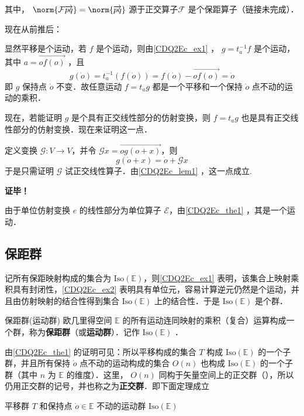 其中， $\norm{\mathcal F\overrightarrow{pq}}=\norm{\overrightarrow{pq}}$ 源于正交算子$\mathcal F$ 是个保距算子（链接未完成）．

现在从前推后：

显然平移是个运动，若 $f$ 是个运动，则由\autoref{CDQ2Ec_ex1} ， $g=t_a^{-1} f$ 是个运动，其中 $a=\overrightarrow{of(o)}$ ，且
\begin{equation}
g(\dot o)=t_a^{-1}(f(\dot o))=f(\dot o)-\overrightarrow{of(o)}=\dot o
\end{equation}
即 $g$ 保持点 $\dot o$ 不变．故任意运动 $f=t_ag$ 都是一个平移和一个保持 $\dot o$ 点不动的运动的乘积．

现在，若能证明 $g$ 是个具有正交线性部分的仿射变换，则 $f=t_a g$ 也是具有正交线性部分的仿射变换．现在来证明这一点．

定义变换 $\mathcal G:V\rightarrow V$，并令 $\mathcal G x=\overrightarrow{og(o+x)}$，则
\begin{equation}\label{CDQ2Ec_eq1}
g(\dot o+x)=\dot o+\mathcal G x
\end{equation}
于是只需证明 $\mathcal G$ 试正交线性算子．由\autoref{CDQ2Ec_lem1} ，这一点成立.

\textbf{证毕！}
\begin{example}{}\label{CDQ2Ec_ex2}
由于单位仿射变换 $e$ 的线性部分为单位算子 $\mathcal E$，由\autoref{CDQ2Ec_the1} ，其是一个运动．
\end{example}
\subsection{保距群}
记所有保距映射构成的集合为 $\mathrm{Iso(\mathbb E)}$，则\autoref{CDQ2Ec_ex1} 表明，该集合上映射乘积具有封闭性，\autoref{CDQ2Ec_ex2} 表明具有单位元，容易计算逆元仍然是个运动，并且由仿射映射的结合性得到集合 $\mathrm{Iso(\mathbb E)}$ 上的结合性．于是 $\mathrm{Iso}(\mathbb E)$ 是个群．
\begin{definition}{保距群(运动群)}
欧几里得空间 $\mathbb E$ 的所有运动连同映射的乘积（复合）运算构成一个群，称为\textbf{保距群}（或\textbf{运动群}）．记作 $\mathrm{Iso(\mathbb E)}$ ．
\end{definition}
由\autoref{CDQ2Ec_the1} 的证明可见：所以平移构成的集合 $T$ 构成 $\mathrm{Iso}(\mathbb E)$ 的一个子群，并且所有保持 $\dot o$ 点不动的运动构成的集合 $O(n)$ 也构成 $\mathrm{Iso}(\mathbb E)$ 的一个子群（其中 $n$ 为 $\mathbb E$ 的维度）．这里， $O(n)$ 同构于矢量空间上的正交群（），所以仍用正交群的记号，并也称之为\textbf{正交群}．即下面定理成立
\begin{theorem}{}
平移群 $T$ 和保持点 $\dot o\in\mathbb E$ 不动的运动群 $\mathrm{Iso(\mathbb E)}$ 
\end{theorem}